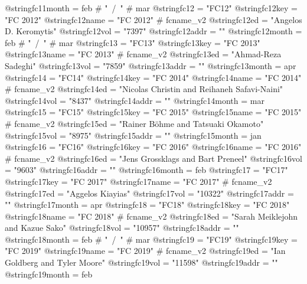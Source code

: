 @string{fc11month =             feb # "~/~" # mar}
@string{fc12 =                  "FC12"}
@string{fc12key =               "FC 2012"}
@string{fc12name =              "FC 2012" # fcname_v2}
@string{fc12ed =                "Angelos D. Keromytis"}
@string{fc12vol =               "7397"}
@string{fc12addr =              ""}
@string{fc12month =             feb # "~/~" # mar}
@string{fc13 =                  "FC13"}
@string{fc13key =               "FC 2013"}
@string{fc13name =              "FC 2013" # fcname_v2}
@string{fc13ed =                "Ahmad-Reza Sadeghi"}
@string{fc13vol =               "7859"}
@string{fc13addr =              ""}
@string{fc13month =             apr}
@string{fc14 =                  "FC14"}
@string{fc14key =               "FC 2014"}
@string{fc14name =              "FC 2014" # fcname_v2}
@string{fc14ed =                "Nicolas Christin and Reihaneh {Safavi-Naini}"}
@string{fc14vol =               "8437"}
@string{fc14addr =              ""}
@string{fc14month =             mar}
@string{fc15 =                  "FC15"}
@string{fc15key =               "FC 2015"}
@string{fc15name =              "FC 2015" # fcname_v2}
@string{fc15ed =                "Rainer B{\"o}hme and Tatsuaki Okamoto"}
@string{fc15vol =               "8975"}
@string{fc15addr =              ""}
@string{fc15month =             jan}
@string{fc16 =                  "FC16"}
@string{fc16key =               "FC 2016"}
@string{fc16name =              "FC 2016" # fcname_v2}
@string{fc16ed =                "Jens Grossklags and Bart Preneel"}
@string{fc16vol =               "9603"}
@string{fc16addr =              ""}
@string{fc16month =             feb}
@string{fc17 =                  "FC17"}
@string{fc17key =               "FC 2017"}
@string{fc17name =              "FC 2017" # fcname_v2}
@string{fc17ed =                "Aggelos Kiayias"}
@string{fc17vol =               "10322"}
@string{fc17addr =              ""}
@string{fc17month =             apr}
@string{fc18 =                  "FC18"}
@string{fc18key =               "FC 2018"}
@string{fc18name =              "FC 2018" # fcname_v2}
@string{fc18ed =                "Sarah Meiklejohn and Kazue Sako"}
@string{fc18vol =               "10957"}
@string{fc18addr =              ""}
@string{fc18month =             feb # "~/~" # mar}
@string{fc19 =                  "FC19"}
@string{fc19key =               "FC 2019"}
@string{fc19name =              "FC 2019" # fcname_v2}
@string{fc19ed =                "Ian Goldberg and Tyler Moore"}
@string{fc19vol =               "11598"}
@string{fc19addr =              ""}
@string{fc19month =             feb}
